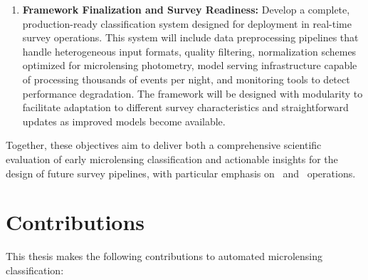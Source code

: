 \begin{enumerate}
    \item \textbf{Framework Finalization and Survey Readiness:} Develop a complete, production-ready classification system designed for deployment in real-time survey operations. This system will include data preprocessing pipelines that handle heterogeneous input formats, quality filtering, normalization schemes optimized for microlensing photometry, model serving infrastructure capable of processing thousands of events per night, and monitoring tools to detect performance degradation. The framework will be designed with modularity to facilitate adaptation to different survey characteristics and straightforward updates as improved models become available.
\end{enumerate}

Together, these objectives aim to deliver both a comprehensive scientific evaluation of early microlensing classification and actionable insights for the design of future survey pipelines, with particular emphasis on \lsst\ and \romantel\ operations.

\section{Contributions}
\label{sec:contributions}

This thesis makes the following contributions to automated microlensing classification:


